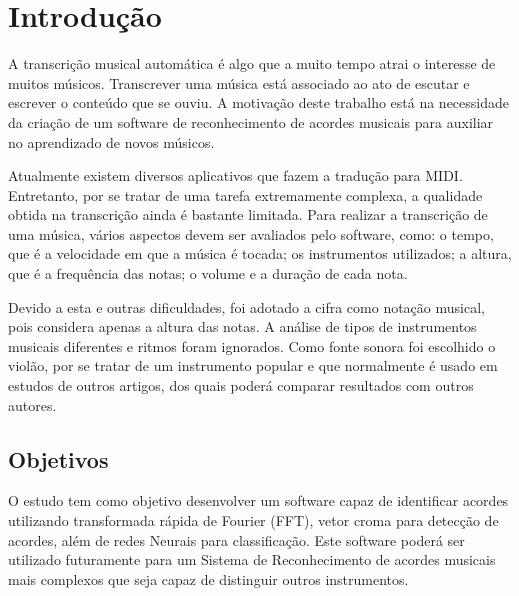 \chapter{Introdução}
\label{cap:introducao}





A transcrição musical automática é algo que a muito tempo atrai o interesse de muitos músicos. Transcrever uma música está associado ao ato de escutar e escrever o conteúdo que se ouviu. A motivação deste trabalho está na necessidade da criação de um software de reconhecimento de acordes musicais para auxiliar no aprendizado de novos músicos. 

Atualmente existem diversos aplicativos que fazem a tradução para \gls{MIDI}. Entretanto, por se tratar de uma tarefa extremamente complexa, a qualidade obtida na transcrição ainda é bastante limitada. 
Para realizar a transcrição de uma música, vários aspectos devem ser avaliados pelo software, como: o tempo, que é a velocidade em que a música é tocada; os instrumentos utilizados; a altura, que é a frequência das notas; o volume e a duração de cada nota. 

Devido a esta e outras dificuldades, foi adotado a cifra como notação musical, pois considera apenas a altura das notas. A análise de tipos de instrumentos musicais diferentes e ritmos foram ignorados. Como fonte sonora foi escolhido o violão, por se tratar de um instrumento popular e que normalmente é usado em  estudos de outros artigos, dos quais poderá comparar resultados com outros autores.


\section{Objetivos}
\label{cap:introducao:sec:objetivos}

O estudo tem como objetivo desenvolver um software capaz de identificar acordes utilizando transformada rápida de Fourier (FFT), vetor croma para detecção de acordes, além de redes Neurais para classificação. Este software poderá ser utilizado futuramente para um Sistema de Reconhecimento de acordes musicais mais complexos que seja capaz de distinguir outros instrumentos. 


